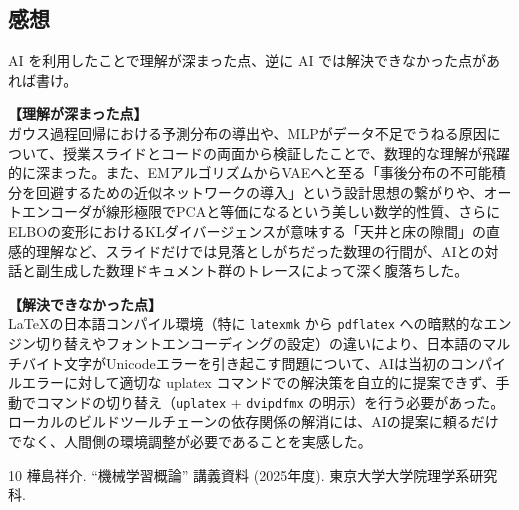 \documentclass[11pt,a4paper,dvipdfmx]{article}
\numberwithin{equation}{section}
\newenvironment{proofbox}[0]
{
    \begin{mdframed}[
        linecolor=black,
        topline=false,
        bottomline=false,
        rightline=false,
        leftline=true,
        linewidth=2pt,
        innerleftmargin=10pt,
        skipabove=\baselineskip,
        skipbelow=\baselineskip,
    ]
}
{
    \end{mdframed}
}
\newenvironment{note}[0]
{
    \begin{tcolorbox}[sharp corners, colframe=gray!20, colback=gray!20, width=\textwidth]
}
{
    \end{tcolorbox}
}
\begin{document}
\subsection*{感想}
\begin{note}
AI を利用したことで理解が深まった点、逆に AI では解決できなかった点があれば書け。
\end{note}
\begin{proofbox}
\textbf{【理解が深まった点】} \\
ガウス過程回帰における予測分布の導出や、MLPがデータ不足でうねる原因について、授業スライドとコードの両面から検証したことで、数理的な理解が飛躍的に深まった。また、EMアルゴリズムからVAEへと至る「事後分布の不可能積分を回避するための近似ネットワークの導入」という設計思想の繋がりや、オートエンコーダが線形極限でPCAと等価になるという美しい数学的性質、さらにELBOの変形におけるKLダイバージェンスが意味する「天井と床の隙間」の直感的理解など、スライドだけでは見落としがちだった数理の行間が、AIとの対話と副生成した数理ドキュメント群のトレースによって深く腹落ちした。

\textbf{【解決できなかった点】} \\
LaTeXの日本語コンパイル環境（特に \texttt{latexmk} から \texttt{pdflatex} への暗黙的なエンジン切り替えやフォントエンコーディングの設定）の違いにより、日本語のマルチバイト文字がUnicodeエラーを引き起こす問題について、AIは当初のコンパイルエラーに対して適切な uplatex コマンドでの解決策を自立的に提案できず、手動でコマンドの切り替え（\texttt{uplatex} + \texttt{dvipdfmx} の明示）を行う必要があった。ローカルのビルドツールチェーンの依存関係の解消には、AIの提案に頼るだけでなく、人間側の環境調整が必要であることを実感した。
\end{proofbox}
\begin{thebibliography}{10}
     樺島祥介. “機械学習概論” 講義資料 (2025年度). 東京大学大学院理学系研究科.
\end{thebibliography}
\end{document}
